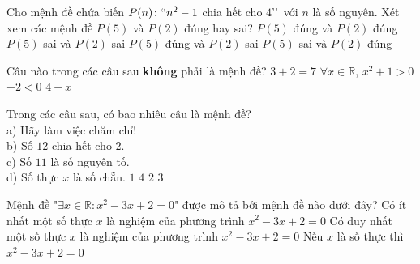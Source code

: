 \begin{ex}%
	Cho mệnh đề chứa biến $P(n)\colon \lq\lq n^2-1$  chia hết cho $4$\rq\rq\, với $n$ là số nguyên. Xét xem các mệnh đề $P(5)$ và $P(2)$ đúng hay sai?
	 \choice
		 {$P(5)$ đúng và $P(2)$ đúng}
		{$P(5)$ sai và $P(2)$  sai}
		{\True $P(5)$ đúng và  $P(2)$ sai}
		 {$P(5)$ sai và $P(2)$ đúng}
\end{ex}

\begin{ex}%
	Câu nào trong các câu sau  \textbf{không} phải là mệnh đề?
	 \choice
		{$3+2=7$} 
		{$\forall x \in \mathbb{R}$, $x^2+1 > 0$} 
		{$-2< 0$} 
		 {\True $4+x$}
\end{ex}

\begin{ex}%
	Trong các câu sau, có bao nhiêu câu  là mệnh đề?\\
	 a) Hãy làm việc chăm chỉ!\\
	 b) Số $12$ chia hết cho $2$.\\
	c)  Số $11$ là số nguyên tố.\\
	d) Số thực $x$  là số chẵn.
	\choice 
		{$1$} 
		 {$4$}
		{\True  $2$}
		 {$3$}
\end{ex}

\begin{ex}%
	Mệnh đề "$\exists x\in\mathbb{R}:  x^2-3x+2=0$" được mô tả bởi mệnh đề nào dưới đây?
		{\True Có ít nhất một số thực $x$ là nghiệm  của phương trình $x^2-3x+2=0$}
		 {Có duy nhất một số thực $x$ là nghiệm của phương trình $x^2-3x+2=0$}
		{Nếu $x$ là số thực thì  $x^2-3x+2=0$}
\end{ex}

